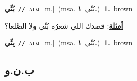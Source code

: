 \documentclass[10pt,a4paper,twoside]{article} %
\begin{document}
\begin{multicols}{2}
{\setlength\topsep{0pt}\textbf{\foreignlanguage{arabic}{بُنِّي}}\ {\color{gray}\texttt{//}\color{black}}\ \textsc{adj}\ [m.]\ \color{gray}(msa. \foreignlanguage{arabic}{بُنِّي}~\foreignlanguage{arabic}{\textbf{١.}})\color{black}\ \textbf{1.}~brown\  \begin{flushright}\color{gray}\foreignlanguage{arabic}{\textbf{\underline{\foreignlanguage{arabic}{أمثلة}}}: قصدك اللي شعرُه بُنِّي ولا الصَّلعا؟}\end{flushright}\color{black}} \vspace{2mm}

{\setlength\topsep{0pt}\textbf{\foreignlanguage{arabic}{بِنِّي}}\ {\color{gray}\texttt{//}\color{black}}\ \textsc{adj}\ [m.]\ \color{gray}(msa. \foreignlanguage{arabic}{بُنِّي}~\foreignlanguage{arabic}{\textbf{١.}})\color{black}\ \textbf{1.}~brown\ } \vspace{2mm}

\vspace{-3mm}
\subsection*{\color{blue}\foreignlanguage{arabic}{ب.ن.و}\color{blue}{}} 


\end{multicols}
\end{document}
